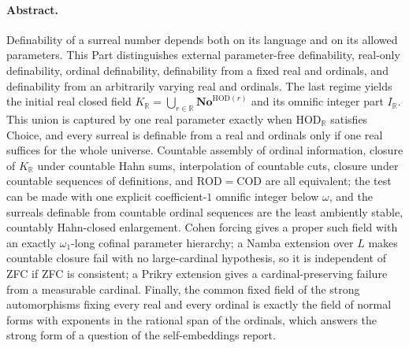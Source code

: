 \documentclass[11pt,a4paper]{article}
\numberwithin{equation}{section}
\theoremstyle{definition}
\theoremstyle{remark}
\newcommand{\No}{\mathbf{No}}
\newcommand{\HOD}{\mathrm{HOD}}
\newcommand{\R}{\mathbb R}
\newcommand{\ROD}{\mathrm{ROD}}
\newcommand{\COD}{\mathrm{COD}}
\newcommand{\HR}{\HOD_{\R}}
\newcommand{\KR}{K_{\R}}
\newcommand{\IR}{I_{\R}}
\begin{document}
\paragraph{Abstract.}
Definability of a surreal number depends both on its language and on its
allowed parameters. This Part distinguishes external parameter-free
definability, real-only definability, ordinal definability, definability
from a fixed real and ordinals, and definability from an arbitrarily
varying real and ordinals. The last regime yields the initial real closed
field $\KR=\bigcup_{r\in\R}\No^{\HOD(r)}$ and its omnific integer part
$\IR$. This union is captured by one real parameter exactly when $\HR$
satisfies Choice, and every surreal is definable from a real and ordinals
only if one real suffices for the whole universe. Countable assembly of
ordinal information, closure of $\KR$ under countable Hahn sums,
interpolation of countable cuts, closure under countable sequences of
definitions, and $\ROD=\COD$ are all equivalent; the test can be made with
one explicit coefficient-$1$ omnific integer below $\omega$, and the
surreals definable from countable ordinal sequences are the least
ambiently stable, countably Hahn-closed enlargement. Cohen forcing gives a
proper such field with an exactly $\omega_1$-long cofinal parameter
hierarchy; a Namba extension over $L$ makes countable closure fail with no
large-cardinal hypothesis, so it is independent of ZFC if ZFC is
consistent; a Prikry extension gives a cardinal-preserving failure from a
measurable cardinal. Finally, the common fixed field of the strong
automorphisms fixing every real and every ordinal is exactly the field of
normal forms with exponents in the rational span of the ordinals, which
answers the strong form of a question of the self-embeddings report.
\end{document}
